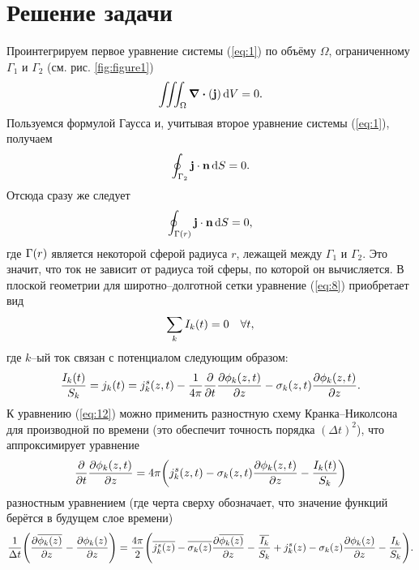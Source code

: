 \documentclass[12pt]{article}
\begin{document}
	\section{Решение задачи}
	Проинтегрируем первое уравнение системы (\ref{eq:1}) по объёму $\Omega$, ограниченному $\Gamma_1$ и $\Gamma_2$ (см. рис. \ref{fig:figure1})
	\begin{equation}
		\iiint_\Omega \div(\vb{j}) \dd{V} = 0.
	\end{equation}
	Пользуемся формулой Гаусса и, учитывая второе уравнение системы (\ref{eq:1}), получаем
	\begin{equation}
		\oint_{\Gamma_2} \vb{j} \cdot \vb{n} \dd{S} = 0.
	\end{equation}
	Отсюда сразу же следует 
	\begin{equation}\label{eq:8}
		\oint_{\Gamma\qty(r)} \vb{j} \cdot \vb{n} \dd{S} = 0,
	\end{equation}
	где $\Gamma\qty(r)$ является некоторой сферой радиуса $r$, лежащей между $\Gamma_1$ и $\Gamma_2$. Это значит, что ток не зависит от радиуса той сферы, по которой он вычисляется.
	 В плоской геометрии для широтно\---долготной сетки уравнение (\ref{eq:8}) приобретает вид
	\begin{equation}\label{eq:11}
		\sum_k I_k\qty(t) = 0 \quad \forall t,
	\end{equation}
	где $k$\---ый ток связан с потенциалом следующим образом:
	\begin{equation}\label{eq:12}
		\dfrac{I_k(t)}{S_k} = j_k(t) = j^s_k (z,t) - \dfrac{1}{4\pi} \pdv{t} \pdv{\phi_k(z,t)}{z} - \sigma_k(z,t) \pdv{\phi_k(z,t)}{z}.
	\end{equation}
	К уравнению (\ref{eq:12}) можно применить разностную схему Кранка\---Николсона для производной по времени (это обеспечит точность порядка $(\Delta t)^2$), что аппроксимирует уравнение
	\begin{equation}
		\pdv{t} \pdv{\phi_k(z,t)}{z} = 4\pi \qty(j^s_k (z,t) - \sigma_k(z,t) \pdv{\phi_k(z,t)}{z} - \dfrac{I_k(t)}{S_k})
	\end{equation}
	разностным уравнением (где черта сверху обозначает, что значение функций берётся в будущем слое времени)
	\begin{equation}\label{eq:14}
		\dfrac1{\Delta t}\qty(\pdv{\overline{\phi_k(z)}}{z} - \pdv{\phi_k(z)}{z}) = \dfrac{4\pi}{2}\qty(\overline{j^s_k (z)} - \overline{\sigma_k(z)} \pdv{\overline{\phi_k(z)}}{z} - \dfrac{\overline{I_k}}{S_k} + j^s_k (z) - \sigma_k(z) \pdv{\phi_k(z)}{z} - \dfrac{I_k}{S_k}).
	\end{equation}
\end{document}
